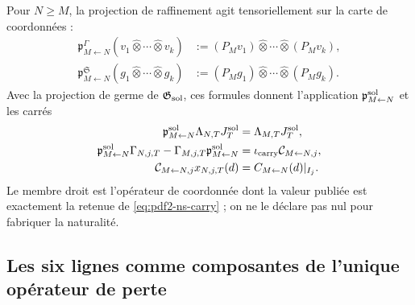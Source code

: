 Pour $N\ge M$, la projection de raffinement agit tensoriellement sur la
carte de coordonnées :
\begin{equation}\label{eq:pdf2-ns-refinement-action}
 \begin{aligned}
 \mathfrak p_{M\leftarrow N}^{\Gamma}
 (v_1\widehat\otimes\cdots\widehat\otimes v_k)
 &:=(P_Mv_1)\widehat\otimes\cdots\widehat\otimes(P_Mv_k),\\
 \mathfrak p_{M\leftarrow N}^{\mathfrak S}
 (g_1\widehat\otimes\cdots\widehat\otimes g_k)
 &:=(P_Mg_1)\widehat\otimes\cdots\widehat\otimes(P_Mg_k).
 \end{aligned}
\end{equation}
Avec la projection de germe de $\mathfrak G_{\rm sol}$, ces formules
donnent l'application $\mathfrak p_{M\leftarrow N}^{\rm sol}$ et les carrés
\begin{equation}\label{eq:pdf2-ns-refinement-commutation}
 \begin{aligned}
 \mathfrak p_{M\leftarrow N}^{\rm sol}\Lambda_{N,T}J_T^{\rm sol}
 &=\Lambda_{M,T}J_T^{\rm sol},\\
 \mathfrak p_{M\leftarrow N}^{\rm sol}\Gamma_{N,j,T}
 -\Gamma_{M,j,T}\mathfrak p_{M\leftarrow N}^{\rm sol}
 &=\iota_{\rm carry}\mathcal C_{M\leftarrow N,j},\\
 \mathcal C_{M\leftarrow N,j}x_{N,j,T}(d)
 &=C_{M\leftarrow N}(d)|_{I_j}.
 \end{aligned}
\end{equation}
Le membre droit est l'opérateur de coordonnée dont la valeur publiée est
exactement la retenue de
\eqref{eq:pdf2-ns-carry} ; on ne le déclare pas nul pour fabriquer la naturalité.

\subsection{Les six lignes comme composantes de l'unique opérateur de perte}

